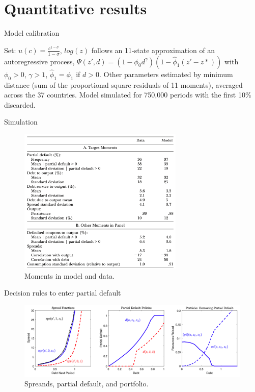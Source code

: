 \documentclass{beamer}
\begin{document}
\section{Quantitative results}

\begin{frame}{Model calibration}

Set:
\smallbreak
\(u(c)=\frac{c^{1-\sigma}}{1-\sigma}\),
\smallbreak
\(log(z)\) follows an 11-state approximation of an autoregressive process,
\smallbreak
\(\Psi(z',d)=(1-\phi_0 d^\gamma)(1-\hat{\phi}_1(z'-z*))\) with \(\phi_0>0\), \(\gamma>1\), \(\hat{\phi}_1=\phi_1\) if \(d>0\).
\bigbreak
Other parameters estimated by minimum distance (sum of the proportional square residuals of 11 moments), averaged across the 37 countries.
\bigbreak
Model simulated for 750,000 periods with the first 10\% discarded.
    
\end{frame}

\begin{frame}{Simulation}
\begin{figure}
    \includegraphics[width=0.7\textwidth]{../outputs/tab_4.png}
    \caption{Moments in model and data.}
\end{figure}
\end{frame}

\begin{frame}{Decision rules to enter partial default}
    \begin{figure}
        \includegraphics[width=1\textwidth]{../outputs/fig_3.png}
        \caption{Spreands, partial default, and portfolio.}
    \end{figure}
    \end{frame}
\end{document}
